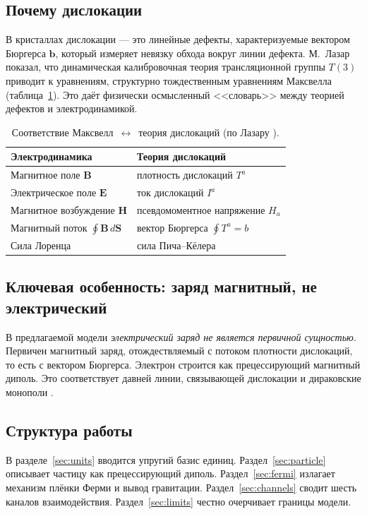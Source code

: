 \documentclass[12pt,a4paper]{article}
\begin{document}
\subsection{Почему дислокации}
В кристаллах дислокации --- это линейные дефекты, характеризуемые вектором
Бюргерса $\mathbf{b}$, который измеряет невязку обхода вокруг линии дефекта.
М.~Лазар \cite{lazar2010} показал, что динамическая калибровочная теория
трансляционной группы $T(3)$ приводит к уравнениям, структурно тождественным
уравнениям Максвелла (таблица~\ref{tab:corr}). Это даёт физически осмысленный
<<словарь>> между теорией дефектов и электродинамикой.

\begin{table}[h]
\centering
\caption{Соответствие Максвелл~$\leftrightarrow$~теория дислокаций (по Лазару \cite{lazar2010}).}
\label{tab:corr}
\begin{tabular}{ll}
\toprule
Электродинамика & Теория дислокаций \\
\midrule
Магнитное поле $\mathbf{B}$ & плотность дислокаций $T^a$ \\
Электрическое поле $\mathbf{E}$ & ток дислокаций $I^a$ \\
Магнитное возбуждение $\mathbf{H}$ & псевдомоментное напряжение $H_a$ \\
Магнитный поток $\oint\mathbf{B}\,d\mathbf{S}$ & вектор Бюргерса $\oint T^a = b$ \\
Сила Лоренца & сила Пича--Кёлера \\
\bottomrule
\end{tabular}
\end{table}

\subsection{Ключевая особенность: заряд магнитный, не электрический}
В предлагаемой модели \emph{электрический заряд не является первичной сущностью}.
Первичен магнитный заряд, отождествляемый с потоком плотности дислокаций, то
есть с вектором Бюргерса. Электрон строится как прецессирующий магнитный диполь.
Это соответствует давней линии, связывающей дислокации и дираковские монополи
\cite{mistura1995}.

\subsection{Структура работы}
В разделе~\ref{sec:units} вводится упругий базис единиц. Раздел~\ref{sec:particle}
описывает частицу как прецессирующий диполь. Раздел~\ref{sec:fermi} излагает
механизм плёнки Ферми и вывод гравитации. Раздел~\ref{sec:channels} сводит шесть
каналов взаимодействия. Раздел~\ref{sec:limits} честно очерчивает границы модели.
\end{document}
